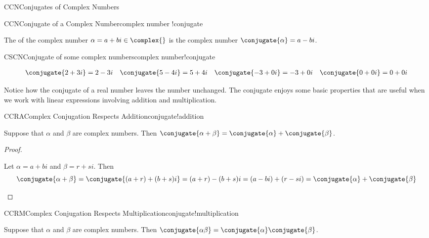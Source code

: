 \begin{subsect}{CCN}{Conjugates of Complex Numbers}
%
\begin{definition}{CCN}{Conjugate of a Complex Number}{complex number !conjugate}
\begin{para}The  of the complex number $\alpha=a+bi\in\complex{\null}$  is the complex number $\conjugate{\alpha}=a-bi$.\end{para}
\end{definition}
%
\begin{example}{CSCN}{Conjugate of some complex numbers}{complex number!conjugate}
%
\begin{para}
\begin{align*}
\conjugate{2+3i}=2-3i&&\conjugate{5-4i}=5+4i&&
\conjugate{-3+0i}=-3+0i&&\conjugate{0+0i}=0+0i
\end{align*}
\end{para}
%
\end{example}
%
\begin{para}Notice how the conjugate of a real number leaves the number unchanged.  The conjugate enjoys some basic properties that are useful when we work with linear expressions involving addition and multiplication.\end{para}
%
\begin{theorem}{CCRA}{Complex Conjugation Respects Addition}{conjugate!addition}
\begin{para}Suppose that $\alpha$ and $\beta$ are complex numbers.  Then $\conjugate{\alpha+\beta}=\conjugate{\alpha}+\conjugate{\beta}$.\end{para}
\end{theorem}
%
\begin{proof}
\begin{para}Let $\alpha=a+bi$ and $\beta=r+si$.  Then
%
\begin{equation*}
\conjugate{\alpha+\beta}=\conjugate{(a+r)+(b+s)i}=(a+r)-(b+s)i=(a-bi)+(r-si)=\conjugate{\alpha}+\conjugate{\beta}
\end{equation*}
\end{para}
%
\end{proof}
%
\begin{theorem}{CCRM}{Complex Conjugation Respects Multiplication}{conjugate!multiplication}
\begin{para}Suppose that $\alpha$ and $\beta$ are complex numbers.  Then $\conjugate{\alpha\beta}=\conjugate{\alpha}\conjugate{\beta}$.\end{para}

\end{theorem}
\end{subsect}
